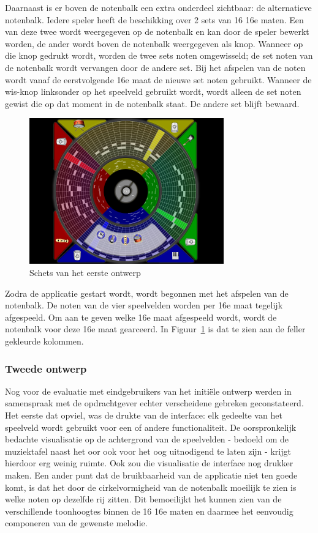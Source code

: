 \documentclass{acm}
\begin{document}
Daarnaast is er boven de notenbalk een extra onderdeel zichtbaar: de alternatieve notenbalk. Iedere speler heeft de beschikking over 2 sets van 16 16e maten. Een van deze twee wordt weergegeven op de notenbalk en kan door de speler bewerkt worden, de ander wordt boven de notenbalk weergegeven als knop. Wanneer op die knop gedrukt wordt, worden de twee sets noten omgewisseld; de set noten van de notenbalk wordt vervangen door de andere set. Bij het afspelen van de noten wordt vanaf de eerstvolgende 16e maat de nieuwe set noten gebruikt. Wanneer de wis-knop linksonder op het speelveld gebruikt wordt, wordt alleen de set noten gewist die op dat moment in de notenbalk staat. De andere set blijft bewaard.

\begin{figure}
  \includegraphics[width=84mm]{img/muziektafel_v1}
  \caption{Schets van het eerste ontwerp}
  \label{fig:muziektafel_v1}
\end{figure}

Zodra de applicatie gestart wordt, wordt begonnen met het afspelen van de notenbalk. De noten van de vier speelvelden worden per 16e maat tegelijk afgespeeld. Om aan te geven welke 16e maat afgespeeld wordt, wordt de notenbalk voor deze 16e maat gearceerd. In Figuur~\ref{fig:muziektafel_v1} is dat te zien aan de feller gekleurde kolommen.

\subsubsection{Tweede ontwerp}
Nog voor de evaluatie met eindgebruikers van het initiële ontwerp werden in samenspraak met de opdrachtgever echter verscheidene gebreken geconstateerd. Het eerste dat opviel, was de drukte van de interface: elk gedeelte van het speelveld wordt gebruikt voor een of andere functionaliteit. De oorspronkelijk bedachte visualisatie op de achtergrond van de speelvelden - bedoeld om de muziektafel naast het oor ook voor het oog uitnodigend te laten zijn - krijgt hierdoor erg weinig ruimte. Ook zou die visualisatie de interface nog drukker maken. Een ander punt dat de bruikbaarheid van de applicatie niet ten goede komt, is dat het door de cirkelvormigheid van de notenbalk moeilijk te zien is welke noten op dezelfde rij zitten. Dit bemoeilijkt het kunnen zien van de verschillende toonhoogtes binnen de 16 16e maten en daarmee het eenvoudig componeren van de gewenste melodie.
\end{document}
